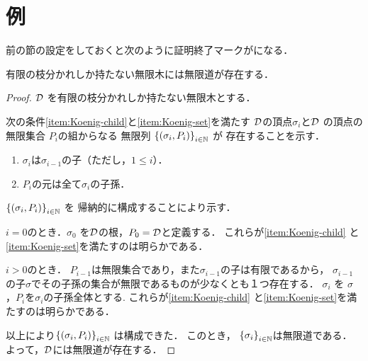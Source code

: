 \documentclass[lualatex, paper=a4, number_of_lines=45]{jlreq}
\begin{document}
\section{例}
前の節の設定をしておくと次のように証明終了マークが\qedsymbol になる．
\begin{lemma}
 有限の枝分かれしか持たない無限木には無限道が存在する．
\end{lemma}
\begin{proof}
  $\mathcal{D}$ を有限の枝分かれしか持たない無限木とする．

 次の条件\cref{item:Koenig-child}と\cref{item:Koenig-set}を満たす
 $\mathcal{D}$の頂点$\sigma_{i}$と$\mathcal{D}$ の頂点の無限集合 $P_{i}$の組からなる
 無限列 $\mathsequence{\mleft(\sigma_{i}, P_{i} \mright)}{i\in\mathnat}$ が
 存在することを示す．
  \begin{enumerate}
   \item $\sigma_{i}$は$\sigma_{i-1}$の子（ただし，$1\leq i$）．
	 \label{item:Koenig-child}
   \item $P_{i}$の元は全て$\sigma_{i}$の子孫．
	 \label{item:Koenig-set}
  \end{enumerate}

  $\mathsequence{\mleft(\sigma_{i}, P_{i} \mright)}{i\in\mathnat}$ を
 帰納的に構成することにより示す．

  $i=0$のとき．$\sigma_{0}$ を$\mathcal{D}$の根，$P_{0}=\mathcal{D}$と定義する．
  これらが\cref{item:Koenig-child} と\cref{item:Koenig-set}を満たすのは明らかである．

  $i>0$のとき．
  $P_{i-1}$は無限集合であり，また$\sigma_{i-1}$の子は有限であるから，
  $\sigma_{i-1}$ の子$\sigma$でその子孫の集合が無限であるものが少なくとも１つ存在する．
  $\sigma_{i}$ を $\sigma$，$P_{i}$を$\sigma_{i}$の子孫全体とする.
 これらが\cref{item:Koenig-child} と\cref{item:Koenig-set}を満たすのは明らかである．

 以上により$\mathsequence{\mleft(\sigma_{i}, P_{i} \mright)}{i\in\mathnat}$ 
 は構成できた．
 このとき， $\mathsequence{\sigma_{i}}{i\in\mathnat}$は無限道である．
 よって，$\mathcal{D}$には無限道が存在する．
\end{proof}
\end{document}
